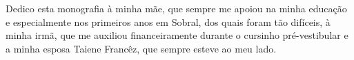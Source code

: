 Dedico esta monografia à minha mãe, que sempre me apoiou na minha
educação e especialmente nos primeiros anos em Sobral, dos quais foram
tão difíceis, à minha irmã, que me auxiliou financeiramente durante o
cursinho pré-vestibular e a minha esposa Taiene Francêz, que sempre esteve ao meu lado.
